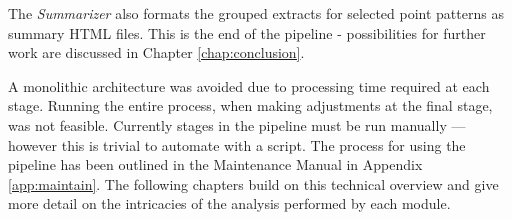   The \textit{Summarizer} also formats the grouped extracts for selected point patterns as summary HTML files. This is the end of the pipeline - possibilities for further work are discussed in Chapter \ref{chap:conclusion}.

  A monolithic architecture was avoided due to processing time required at each stage. Running the entire process, when making adjustments at the final stage, was not feasible. Currently stages in the pipeline must be run manually --- however this is trivial to automate with a script. The process for using the pipeline has been outlined in the Maintenance Manual in Appendix \ref{app:maintain}. The following chapters build on this technical overview and give more detail on the intricacies of the analysis performed by each module.
